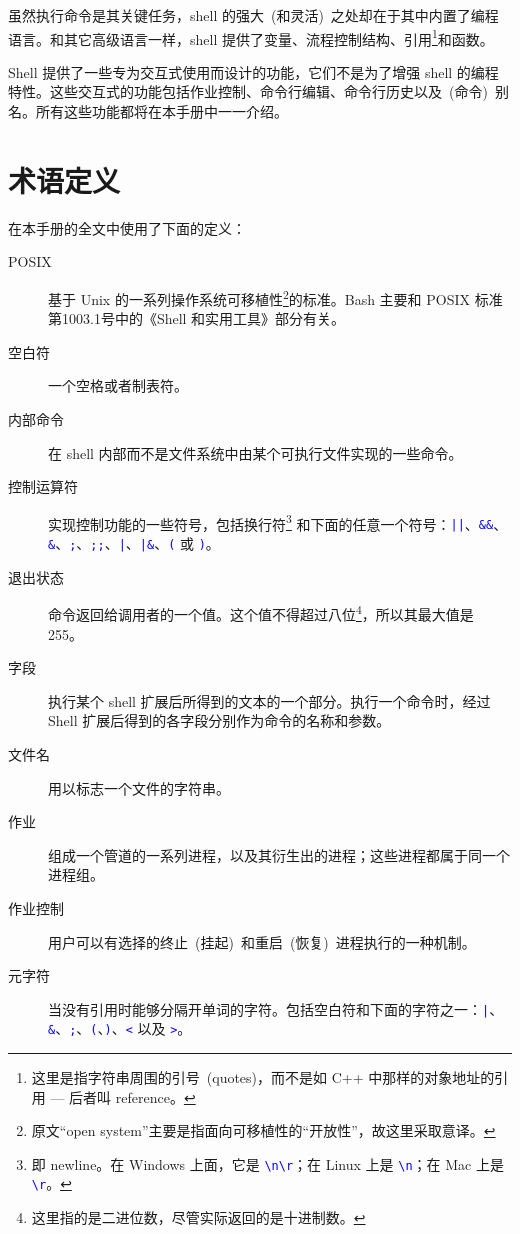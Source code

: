\documentclass[openany,notitlepage]{book}
\newcommand{\code}[1]{\textcolor{blue}{{\tt #1}}}
\begin{document}
\begin{CJK}{UTF8}{song}
虽然执行命令是其关键任务，shell 的强大~(和灵活)~之处却在于其中内置了编程语言。和其它高级语言一样，shell 提供了变量、流程控制结构、引用\footnote{这里是指字符串周围的引号~(quotes)，而不是如 C++ 中那样的对象地址的引用 --- 后者叫 reference。}和函数。

Shell 提供了一些专为交互式使用而设计的功能，它们不是为了增强 shell 的编程特性。这些交互式的功能包括作业控制、命令行编辑、命令行历史以及~(命令)~别名。所有这些功能都将在本手册中一一介绍。


\chapter{术语定义} %
在本手册的全文中使用了下面的定义：
\begin{description}
    \item[POSIX] 基于 Unix 的一系列操作系统可移植性\footnote{原文``open system''主要是指面向可移植性的``开放性''，故这里采取意译。}的标准。Bash 主要和 POSIX 标准第1003.1号中的《Shell 和实用工具》部分有关。
    \item[空白符] 一个空格或者制表符。
    \item[内部命令] 在 shell 内部而不是文件系统中由某个可执行文件实现的一些命令。
    \item[控制运算符] 实现控制功能的一些符号，包括换行符\footnote{即 newline。在 Windows 上面，它是 \code{\textbackslash n\textbackslash r}；在 Linux 上是 \code{\textbackslash n}；在 Mac 上是 \code{\textbackslash r}。} 和下面的任意一个符号：\code{||}、\code{\&\&}、\code{\&}、\code{;}、\code{;;}、\code{|}、\code{|\&}、\code{(} 或 \code{)}。
    \item[退出状态] 命令返回给调用者的一个值。这个值不得超过八位\footnote{这里指的是二进位数，尽管实际返回的是十进制数。}，所以其最大值是 255。
    \item[字段] 执行某个 shell 扩展后所得到的文本的一个部分。执行一个命令时，经过 Shell 扩展后得到的各字段分别作为命令的名称和参数。
    \item[文件名] 用以标志一个文件的字符串。
    \item[作业] 组成一个管道的一系列进程，以及其衍生出的进程；这些进程都属于同一个进程组。
    \item[作业控制] 用户可以有选择的终止~(挂起)~和重启~(恢复)~进程执行的一种机制。
    \item[元字符] 当没有引用时能够分隔开单词的字符。包括空白符和下面的字符之一：\code{|}、\code{\&}、\code{;}、\code{(}、\code{)}、\code{<} 以及 \code{>}。

\end{description}
\end{CJK}
\end{document}

